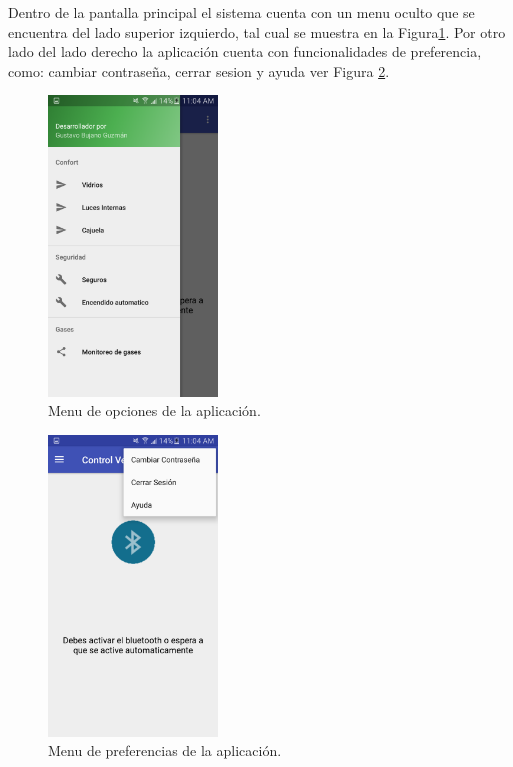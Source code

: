 Dentro de la pantalla principal el sistema cuenta con un menu oculto que se encuentra del lado superior izquierdo, tal cual se muestra en la Figura\ref{menu}. Por otro lado del lado derecho la aplicación cuenta con funcionalidades de preferencia, como: cambiar contraseña, cerrar sesion y ayuda ver Figura \ref{preferencias}.

%
\begin{figure}[H]
\centering
\includegraphics[width=0.4\textwidth]{aplicacion/menu.jpg}
\caption{Menu de opciones de la aplicación.}
\label{menu}
\end{figure}

%
\begin{figure}[H]
\centering
\includegraphics[width=0.4\textwidth]{aplicacion/preferencias.jpg}
\caption{Menu de preferencias de la aplicación.}
\label{preferencias}
\end{figure}

